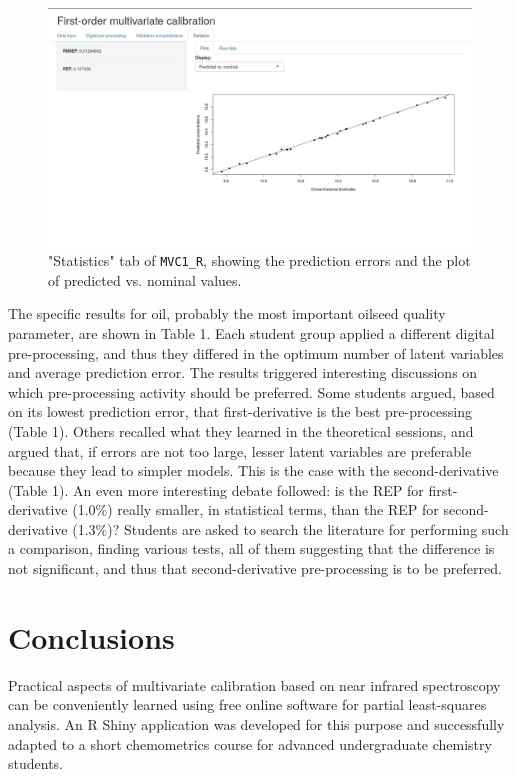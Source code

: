 \documentclass[10pt,twocolumn]{article}
\begin{document}
\begin{figure}[h]
	\includegraphics[width=\linewidth]{figure4.jpg}
	\caption{"Statistics" tab of \texttt{MVC1\_R}, showing the prediction errors
	and the plot of predicted vs. nominal values.}
	\label{fig:4}
\end{figure}

The specific results for oil, probably the most important oilseed quality
parameter, are shown in Table 1. Each student group applied a different digital
pre-processing, and thus they differed in the optimum number of latent variables
and average prediction error. The results triggered interesting discussions on
which pre-processing activity should be preferred. Some students argued, based
on its lowest prediction error, that first-derivative is the best pre-processing
(Table 1). Others recalled what they learned in the theoretical sessions, and
argued that, if errors are not too large, lesser latent variables are preferable
because they lead to simpler models. This is the case with the second-derivative
(Table 1). An even more interesting debate followed: is the REP for
first-derivative (1.0\%) really smaller, in statistical terms, than the REP for
second-derivative (1.3\%)? Students are asked to search the literature for
performing such a comparison, finding various tests, all of them suggesting that
the difference is not significant, and thus that second-derivative
pre-processing is to be preferred.

\newpage

\section*{Conclusions}
Practical aspects of multivariate calibration based on near infrared
spectroscopy can be conveniently learned using free online software for partial
least-squares analysis. An R Shiny application was developed for this purpose
and successfully adapted to a short chemometrics course for advanced
undergraduate chemistry students.
\end{document}
